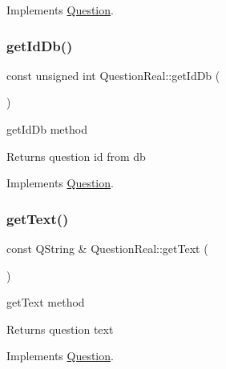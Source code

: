 Implements \hyperlink{class_question_a31d98a74f4e54916d11bc2817b5518a4}{Question}.

\mbox{\label{class_question_real_abc9b0cc639161eb99a2c256c4b8579ed}} 
\subsubsection{\texorpdfstring{get\+Id\+Db()}{getIdDb()}}
{\footnotesize\ttfamily const unsigned int Question\+Real\+::get\+Id\+Db (\begin{DoxyParamCaption}{ }\end{DoxyParamCaption})\hspace{0.3cm}{\ttfamily [virtual]}}



get\+Id\+Db method 

\begin{DoxyReturn}{Returns}
question id from db 
\end{DoxyReturn}


Implements \hyperlink{class_question_a5253480b740d35dfb7fe1331d74457b3}{Question}.

\mbox{\label{class_question_real_aeeecdcaca7e7c3dd1d29794a662b2af1}} 
\subsubsection{\texorpdfstring{get\+Text()}{getText()}}
{\footnotesize\ttfamily const Q\+String \& Question\+Real\+::get\+Text (\begin{DoxyParamCaption}{ }\end{DoxyParamCaption})\hspace{0.3cm}{\ttfamily [virtual]}}



get\+Text method 

\begin{DoxyReturn}{Returns}
question text 
\end{DoxyReturn}


Implements \hyperlink{class_question_a23e84af04f16e0dee933844d5c46b370}{Question}.

\mbox{\label{class_question_real_a771a990ea4f4e91574bc2cc5ec101ab5}} 
